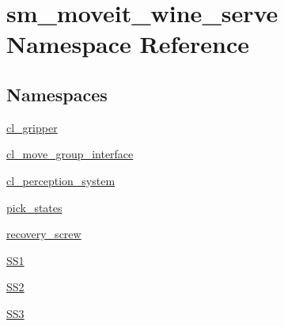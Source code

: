 \hypertarget{namespacesm__moveit__wine__serve}{}\section{sm\+\_\+moveit\+\_\+wine\+\_\+serve Namespace Reference}
\label{namespacesm__moveit__wine__serve}
\subsection*{Namespaces}
\begin{DoxyCompactItemize}
\item 
 \hyperlink{namespacesm__moveit__wine__serve_1_1cl__gripper}{cl\+\_\+gripper}
\item 
 \hyperlink{namespacesm__moveit__wine__serve_1_1cl__move__group__interface}{cl\+\_\+move\+\_\+group\+\_\+interface}
\item 
 \hyperlink{namespacesm__moveit__wine__serve_1_1cl__perception__system}{cl\+\_\+perception\+\_\+system}
\item 
 \hyperlink{namespacesm__moveit__wine__serve_1_1pick__states}{pick\+\_\+states}
\item 
 \hyperlink{namespacesm__moveit__wine__serve_1_1recovery__screw}{recovery\+\_\+screw}
\item 
 \hyperlink{namespacesm__moveit__wine__serve_1_1SS1}{S\+S1}
\item 
 \hyperlink{namespacesm__moveit__wine__serve_1_1SS2}{S\+S2}
\item 
 \hyperlink{namespacesm__moveit__wine__serve_1_1SS3}{S\+S3}
\end{DoxyCompactItemize}
